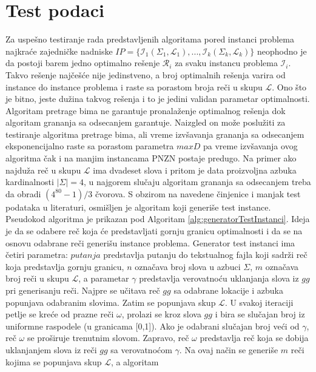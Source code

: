 \documentclass[12pt,oneside]{memoir}
\begin{document}
\section{Test podaci}
\label{sec:testPodaci}
Za uspešno testiranje rada predstavljenih algoritama pored instanci problema najkraće
zajedničke nadniske
$IP = \{\mathcal{I}_{1}(\Sigma_{1},\mathcal{L}_{1}),...,\mathcal{I}_{k}(\Sigma_{k},\mathcal{L}_{k})\}$
neophodno je da postoji barem jedno optimalno rešenje $\mathcal{R}_{i}$ za svaku
instancu problema $\mathcal{I}_{i}$. Takvo rešenje najčešće nije jedinstveno,
a broj optimalnih rešenja varira od instance do instance problema i raste sa porastom
broja reči u skupu $\mathcal{L}$. Ono što je bitno, jeste dužina takvog rešenja i to je
jedini validan parametar optimalnosti. Algoritam pretrage bima ne garantuje pronalaženje
optimalnog rešenja dok algoritam grananja sa odsecanjem garantuje. Naizgled on može poslužiti
za testiranje algoritma pretrage bima, ali
vreme izvšavanja grananja sa odsecanjem eksponencijalno raste sa porastom parametra $maxD$
pa vreme izvšavanja ovog algoritma čak i na manjim instancama PNZN postaje predugo.
Na primer ako najduža reč u skupu $\mathcal{L}$ ima dvadeset slova i pritom je
data proizvoljna azbuka kardinalnosti $|\Sigma|=4$, u najgorem slučaju
algoritam grananja sa odsecanjem treba da obradi $(4^{80}-1)/3$ čvorova.
S obzirom na navedene činjenice i manjak test podataka u literaturi, osmišljen je
algoritam koji generiše test instance. Pseudokod algoritma je prikazan pod
Algoritam \ref{alg:generatorTestInstanci}. Ideja je da se odabere reč koja će 
predstavljati gornju granicu optimalnosti i da se na osnovu odabrane reči
generišu instance problema.
Generator test instanci ima četiri parametra: $putanja$ predstavlja putanju do
tekstualnog fajla koji sadrži reč koja predstavlja gornju granicu, $n$ označava
broj slova u azbuci $\Sigma$, $m$ označava broj reči u skupu $\mathcal{L}$,
a parametar $\gamma$ predstavlja verovatnoću uklanjanja slova iz $gg$ pri generisanju
reči. Najpre se učitava reč $gg$ sa odabrane lokacije i azbuka popunjava
odabranim slovima. Zatim se popunjava skup $\mathcal{L}$.
U svakoj iteraciji petlje se kreće od prazne reči $\omega$, prolazi se
kroz slova $gg$ i bira se slučajan broj iz uniformne raspodele (u granicama [0,1]).
Ako je odabrani slučajan broj veći od $\gamma$, reč $\omega$ se proširuje
trenutnim slovom. Zapravo, reč $\omega$ predstavlja reč koja se dobija uklanjanjem slova iz 
reči $gg$ sa verovatnoćom $\gamma$.
Na ovaj način se generiše $m$ reči kojima se popunjava skup $\mathcal{L}$, a algoritam
\end{document}
